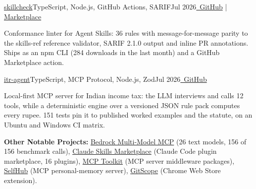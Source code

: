 \resumeExp
{\href{https://github.com/Sagargupta16/skillcheck}{skillcheck}}{TypeScript, Node.js, GitHub Actions, SARIF}{Jul 2026}{\href{https://github.com/Sagargupta16/skillcheck}{\faGithub\ GitHub} | \href{https://github.com/marketplace/actions/skillcheck-for-agent-skills}{Marketplace}}
\resumeItemListStart
    \item[$\diamond$] Conformance linter for Agent Skills: 36 rules with message-for-message parity to the skills-ref reference validator, SARIF 2.1.0 output and inline PR annotations. Ships as an npm CLI (284 downloads in the last month) and a GitHub Marketplace action.
\resumeItemListEnd

\resumeExp
{\href{https://github.com/Sagargupta16/itr-agent}{itr-agent}}{TypeScript, MCP Protocol, Node.js, Zod}{Jul 2026}{\href{https://github.com/Sagargupta16/itr-agent}{\faGithub\ GitHub}}
\resumeItemListStart
    \item[$\diamond$] Local-first MCP server for Indian income tax: the LLM interviews and calls 12 tools, while a deterministic engine over a versioned JSON rule pack computes every rupee. 151 tests pin it to published worked examples and the statute, on an Ubuntu and Windows CI matrix.
\resumeItemListEnd

\resumeSubHeadingListEnd
\vspace{-2pt}
\small{\textbf{Other Notable Projects:} \href{https://github.com/Sagargupta16/bedrock-multi-model-mcp}{Bedrock Multi-Model MCP} (26 text models, 156 of 156 benchmark calls), \href{https://github.com/Sagargupta16/claude-skills}{Claude Skills Marketplace} (Claude Code plugin marketplace, 16 plugins), \href{https://github.com/Sagargupta16/mcp-toolkit}{MCP Toolkit} (MCP server middleware packages), \href{https://github.com/Sagargupta16/SelfHub}{SelfHub} (MCP personal-memory server), \href{https://chromewebstore.google.com/detail/gitscope/fndaanihifimmlnmkjdmjbbkbdajolff}{GitScope} (Chrome Web Store extension).}
\vspace{-2mm}
